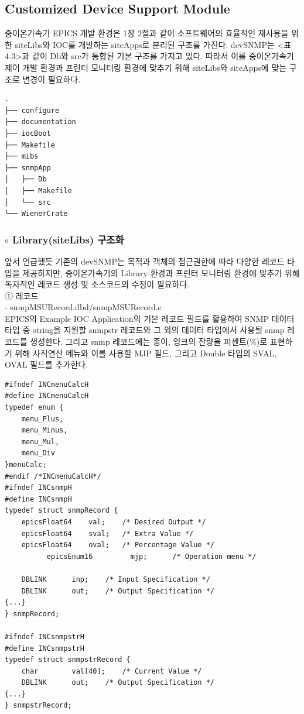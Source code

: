 \documentclass[11pt
  , a4paper
  , article
  , oneside
]{memoir}
\begin{document}
\subsection{Customized Device Support Module}
중이온가속기 EPICS 개발 환경은 1장 2절과 같이 소프트웨어의 효율적인 재사용을 위한 siteLibs와 IOC를 개발하는 siteApps로 분리된 구조를 가진다. devSNMP는 <표 4-3>과 같이 Db와 src가 통합된 기본 구조를 가지고 있다. 따라서 이를 중이온가속기 제어 개발 환경과 프린터 모니터링 환경에 맞추기 위해 siteLibs와 siteApps에 맞는 구조로 변경이 필요하다.

{\scriptsize
\begin{verbatim}
.
├── configure
├── documentation
├── iocBoot
├── Makefile
├── mibs
├── snmpApp
│   ├── Db
│   ├── Makefile
│   └── src
└── WienerCrate
\end{verbatim}
}

\subsubsection{$ \circ $ Library(siteLibs) 구조화}
앞서 언급했듯 기존의 devSNMP는 목적과 객체의 접근권한에 따라 다양한 레코드 타입을 제공하지만, 중이온가속기의 Library 환경과 프린터 모니터링 환경에 맞추기 위해 독자적인 레코드 생성 및 소스코드의 수정이 필요하다.\\

①  레코드\\
- snmpMSURecord.dbd/snmpMSURecord.c\\
EPICS의 Example IOC Application의 기본 레코드 필드를 활용하여 SNMP 데이터 타입 중 string을 지원할 snmpstr 레코드와 그 외의 데이터 타입에서 사용될 snmp 레코드를 생성한다. 그리고 snmp 레코드에는 종이, 잉크의 잔량을 퍼센트(\%)로 표현하기 위해 사칙연산 메뉴와 이를 사용할 MJP 필드, 그리고 Double 타입의 SVAL, OVAL 필드를 추가한다.

{\scriptsize
\begin{lstlisting}[style=termstyle]
#ifndef INCmenuCalcH
#define INCmenuCalcH
typedef enum {
	menu_Plus,
	menu_Minus,
	menu_Mul,
	menu_Div
}menuCalc;
#endif /*INCmenuCalcH*/
#ifndef INCsnmpH
#define INCsnmpH
typedef struct snmpRecord {
	epicsFloat64	val;	/* Desired Output */
	epicsFloat64	sval;	/* Extra Value */
	epicsFloat64	oval;	/* Percentage Value */
          epicsEnum16         mjp;      /* Operation menu */

	DBLINK		inp;	/* Input Specification */
	DBLINK		out;	/* Output Specification */
{...}
} snmpRecord;

#ifndef INCsnmpstrH
#define INCsnmpstrH
typedef struct snmpstrRecord {
	char		val[40];	/* Current Value */
	DBLINK		out;	/* Output Specification */
{...}
} snmpstrRecord;
\end{lstlisting}
}
\end{document}
